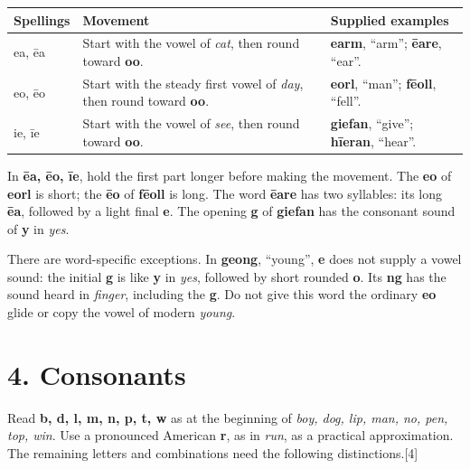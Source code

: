 \par\begingroup
\fontsize{10.5}{13.2}\selectfont
\setlength{\LTleft}{0pt}\setlength{\LTright}{\fill}
\noindent
\begin{tabular}{@{}>{\raggedright\arraybackslash}p{19.374mm}>{\raggedright\arraybackslash}p{63.45mm}>{\raggedright\arraybackslash}p{35.552mm}@{}}
\toprule
\textbf{Spellings} & \textbf{Movement} & \textbf{Supplied examples} \\
\midrule
ea, ēa & Start with the vowel of \emph{cat}, then round toward \textbf{oo}. & \textbf{earm}, “arm”; \textbf{ēare}, “ear”. \\
eo, ēo & Start with the steady first vowel of \emph{day}, then round toward \textbf{oo}. & \textbf{eorl}, “man”; \textbf{fēoll}, “fell”. \\
ie, īe & Start with the vowel of \emph{see}, then round toward \textbf{oo}. & \textbf{giefan}, “give”; \textbf{hīeran}, “hear”. \\
\bottomrule
\end{tabular}
\par\endgroup

In \textbf{ēa, ēo, īe}, hold the first part longer before making the movement. The \textbf{eo} of \textbf{eorl} is short; the \textbf{ēo} of \textbf{fēoll} is long. The word \textbf{ēare} has two syllables: its long \textbf{ēa}, followed by a light final \textbf{e}. The opening \textbf{g} of \textbf{giefan} has the consonant sound of \textbf{y} in \emph{yes}.

There are word-specific exceptions. In \textbf{geong}, “young”, \textbf{e} does not supply a vowel sound: the initial \textbf{g} is like \textbf{y} in \emph{yes}, followed by short rounded \textbf{o}. Its \textbf{ng} has the sound heard in \emph{finger}, including the \textbf{g}. Do not give this word the ordinary \textbf{eo} glide or copy the vowel of modern \emph{young}.

\section*{4. Consonants}

Read \textbf{b, d, l, m, n, p, t, w} as at the beginning of \emph{boy, dog, lip, man, no, pen, top, win}. Use a pronounced American \textbf{r}, as in \emph{run}, as a practical approximation. The remaining letters and combinations need the following distinctions.[4]

